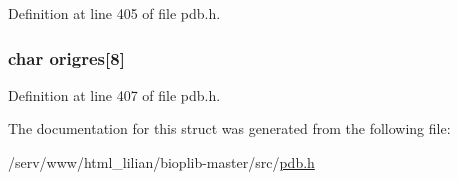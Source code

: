 Definition at line 405 of file pdb.\-h.

\hypertarget{struct__modres_af3d559120b450f45a3ee29281dbf70b8}{
\subsubsection[{origres}]{\setlength{\rightskip}{0pt plus 5cm}char origres\mbox{[}8\mbox{]}}}\label{struct__modres_af3d559120b450f45a3ee29281dbf70b8}


Definition at line 407 of file pdb.\-h.



The documentation for this struct was generated from the following file\-:\begin{DoxyCompactItemize}
\item 
/serv/www/html\-\_\-lilian/bioplib-\/master/src/\hyperlink{pdb_8h}{pdb.\-h}\end{DoxyCompactItemize}
